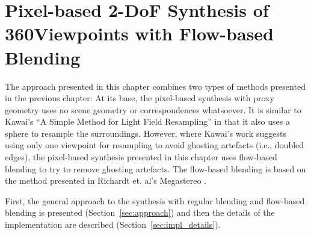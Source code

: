 \chapter{Pixel-based 2-DoF Synthesis of 360\degree Viewpoints with Flow-based Blending}\label{chap:implementation}


The approach presented in this chapter combines two types of methods presented in the previous chapter: At its base, the pixel-based synthesis with proxy geometry uses no scene geometry or correspondences whatsoever. It is similar to Kawai's ``A Simple Method for Light Field Resampling'' \cite{simple_poster} in that it also uses a sphere to resample the surroundings. However, where Kawai's work suggests using only one viewpoint for resampling to avoid ghosting artefacts (i.e., doubled edges), the pixel-based synthesis presented in this chapter uses flow-based blending to try to remove ghosting artefacts. The flow-based blending is based on the method presented in Richardt et. al's Megastereo \cite{megastereo}.

First, the general approach to the synthesis with regular blending and flow-based blending is presented (Section~\ref{sec:approach}) and then the details of the implementation are described (Section~\ref{sec:impl_details}).

